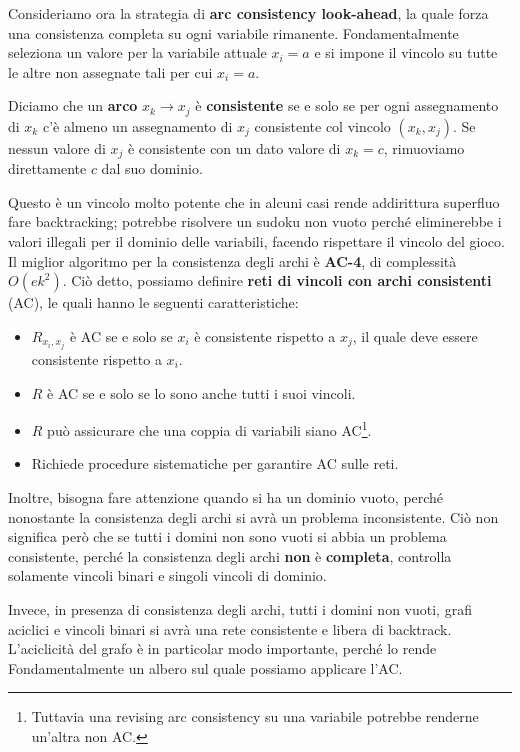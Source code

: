 \noindent Consideriamo ora la strategia di \textbf{arc consistency look-ahead}, la quale forza una consistenza completa su ogni variabile rimanente.
Fondamentalmente seleziona un valore per la variabile attuale $x_i = a$ e si impone il vincolo su tutte le altre non assegnate tali per cui
$x_i = a$.\par
Diciamo che un \textbf{arco} $x_k\to x_j$ è \textbf{consistente} se e solo se per ogni assegnamento di $x_k$ c'è almeno un assegnamento di $x_j$
consistente col vincolo $(x_k, x_j)$. Se nessun valore di $x_j$ è consistente con un dato valore di $x_k = c$, rimuoviamo direttamente $c$ dal suo
dominio.\par
Questo è un vincolo molto potente che in alcuni casi rende addirittura superfluo fare backtracking; potrebbe risolvere un sudoku non vuoto perché
eliminerebbe i valori illegali per il dominio delle variabili, facendo rispettare il vincolo del gioco. Il miglior algoritmo per la consistenza degli
archi è \textbf{AC-4}, di complessità $O(ek^2)$. Ciò detto, possiamo definire \textbf{reti di vincoli con archi consistenti} (AC), le quali hanno le
seguenti caratteristiche: \begin{itemize}
	\item $R_{x_i, x_j}$ è AC se e solo se $x_i$ è consistente rispetto a $x_j$, il quale deve essere consistente rispetto a $x_i$.
	\item $R$ è AC se e solo se lo sono anche tutti i suoi vincoli.
	\item $R$ può assicurare che una coppia di variabili siano AC\footnote{Tuttavia una revising arc consistency su una variabile potrebbe renderne
        un'altra non AC.}.
	\item Richiede procedure sistematiche per garantire AC sulle reti.
\end{itemize}

\noindent Inoltre, bisogna fare attenzione quando si ha un dominio vuoto, perché nonostante la consistenza degli archi si avrà un problema inconsistente.
Ciò non significa però che se tutti i domini non sono vuoti si abbia un problema consistente, perché la consistenza degli archi \textbf{non} è
\textbf{completa}, controlla solamente vincoli binari e singoli vincoli di dominio.\par
Invece, in presenza di consistenza degli archi, tutti i domini non vuoti, grafi aciclici e vincoli binari si avrà una rete consistente e libera di
backtrack. L'aciclicità del grafo è in particolar modo importante, perché lo rende Fondamentalmente un albero sul quale possiamo applicare l'AC.